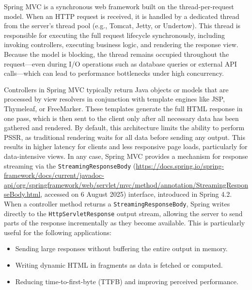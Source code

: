 \documentclass[software,article,accept,pdftex,moreauthors]{Definitions/mdpi}
\begin{document}
Spring MVC is a synchronous web framework built on the thread-per-request
model. When an HTTP request is received, it is handled by a dedicated thread
from the server’s thread pool (e.g., Tomcat, Jetty, or Undertow). This thread
is responsible for executing the full request lifecycle synchronously,
including invoking controllers, executing business logic, and rendering the
response view. Because the model is blocking, the thread remains occupied
throughout the request---even during I/O operations such as database queries or
external API calls---which can lead to performance bottlenecks under high
concurrency.

Controllers in Spring MVC typically return Java objects or models that are
processed by view resolvers in conjunction with template engines like JSP,
Thymeleaf, or FreeMarker. These templates generate the full HTML response in
one pass, which is then sent to the client only after all necessary data has
been gathered and rendered. By default, this architecture limits the ability to
perform PSSR, as traditional rendering waits for all data before sending any
output. This results in higher latency for clients and less responsive page
loads, particularly for data-intensive views. In any case, Spring MVC provides a
mechanism for response streaming via the
\texttt{StreamingResponseBody} ({\url{https://docs.spring.io/spring-framework/docs/current/javadoc-api/org/springframework/web/servlet/mvc/method/annotation/StreamingResponseBody.html}}, accessed on 6 August 2025)
interface, introduced in Spring 4.2. When a controller method returns a
\texttt{StreamingResponseBody}, Spring writes directly to the
\texttt{HttpServletResponse} output stream, allowing the server to send parts
of the response incrementally as they become available. This is particularly
useful for the following applications:
\begin{itemize}
    \item Sending large responses without buffering the entire output in memory.
    \item Writing dynamic HTML in fragments as data is fetched or computed.
    \item Reducing time-to-first-byte (TTFB) and improving perceived performance.
\end{itemize}
\end{document}
